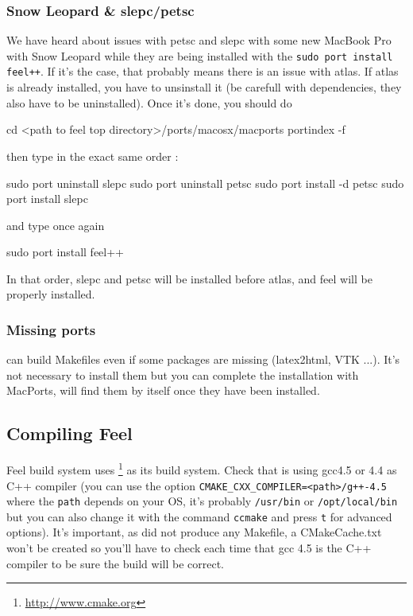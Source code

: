 \subsubsection{Snow Leopard \& slepc/petsc}
We have heard about issues with petsc and slepc with some new MacBook Pro with Snow Leopard while they are being installed with the \verb|sudo port install feel++|. If it's the case, that probably means there is an issue with atlas. If atlas is already installed, you have to unsinstall it (be carefull with dependencies, they also have to be uninstalled). Once it's done, you should do
\begin{unixcom}
		cd <path to feel top directory>/ports/macosx/macports
		portindex -f
\end{unixcom}

then type in the exact same order :
\begin{unixcom}
		sudo port uninstall slepc
		sudo port uninstall petsc
		sudo port install -d petsc
		sudo port install slepc
\end{unixcom}
and type once again
\begin{unixcom}
		sudo port install feel++
\end{unixcom}

In that order, slepc and petsc will be installed before atlas, and feel will be properly installed.

\subsubsection{Missing ports}
\cmake can build Makefiles even if some packages are missing (latex2html, VTK ...). It's not necessary to install them but you can complete the installation with MacPorts, \cmake will find them by itself once they have been installed.

\subsection{Compiling Feel}
\label{compilingfeel}
Feel build system uses \cmake{}\footnote{\url{http://www.cmake.org}}
as its build system. Check that \cmake is using gcc4.5 or 4.4 as C++ compiler
(you can use the option \verb|CMAKE_CXX_COMPILER=<path>/g++-4.5| where the
\verb|path| depends on your OS, it's probably \verb|/usr/bin| or
\verb|/opt/local/bin| but you can also change it with the command \verb|ccmake|
and press \verb|t| for advanced options).  It's important, as \cmake did
not produce any Makefile, a CMakeCache.txt won't be created so you'll have to
check each time that gcc 4.5 is the C++ compiler to be sure the build will be
correct.

